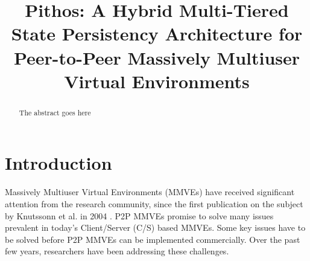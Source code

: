 \documentclass[10pt,a4paper,conference]{IEEEtran}
\begin{document}
%
\title{Pithos: A Hybrid Multi-Tiered State Persistency Architecture for Peer-to-Peer Massively Multiuser Virtual Environments}


\maketitle

\begin{abstract}
The abstract goes here

\end{abstract}


\section{Introduction}
\label{introduction}

%

%
%
%
%

 Massively Multiuser Virtual Environments (MMVEs) have received significant attention from the research community,
since the first publication on the subject by Knutssonn et al. in 2004 \cite{knutsson_p2p_first}. P2P MMVEs promise to solve many issues prevalent in
today's Client/Server (C/S) based MMVEs. Some key issues have to be solved before P2P MMVEs can be implemented commercially. Over the past few years,
researchers have been addressing these challenges.
\end{document}
